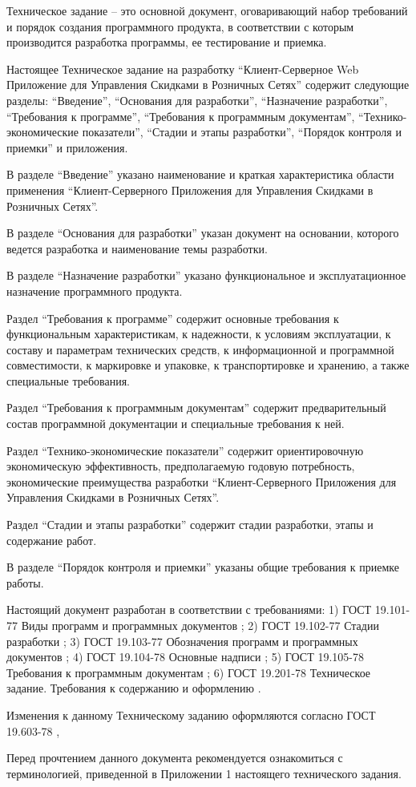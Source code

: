 
\tab[0.75cm] Техническое задание – это основной документ, оговаривающий набор требований и
порядок создания программного продукта, в соответствии с которым производится разработка
программы, ее тестирование и приемка.

Настоящее Техническое задание на разработку ``Клиент-Серверное Web Приложение для Управления Скидками в Розничных Сетях'' содержит следующие разделы: ``Введение'', ``Основания для разработки'',
``Назначение разработки'', ``Требования к программе'', ``Требования к программным документам'',
``Технико-экономические показатели'', ``Стадии и этапы разработки'', ``Порядок контроля и
приемки'' и приложения.

В разделе ``Введение'' указано наименование и краткая характеристика области применения
``Клиент-Серверного Приложения для Управления Скидками в Розничных Сетях''.

В разделе ``Основания для разработки'' указан документ на основании, которого ведется
разработка и наименование темы разработки.

В разделе ``Назначение разработки'' указано функциональное и эксплуатационное
назначение программного продукта.

Раздел ``Требования к программе'' содержит основные требования к функциональным
характеристикам, к надежности, к условиям эксплуатации, к составу и параметрам технических
средств, к информационной и программной совместимости, к маркировке и упаковке, к
транспортировке и хранению, а также специальные требования.

Раздел ``Требования к программным документам'' содержит предварительный состав
программной документации и специальные требования к ней.

Раздел ``Технико-экономические показатели'' содержит ориентировочную экономическую
эффективность, предполагаемую годовую потребность, экономические преимущества разработки
``Клиент-Серверного Приложения для Управления Скидками в Розничных Сетях''.

Раздел ``Стадии и этапы разработки'' содержит стадии разработки, этапы и содержание
работ.

В разделе ``Порядок контроля и приемки'' указаны общие требования к приемке работы.

Настоящий документ разработан в соответствии с требованиями:
1) ГОСТ 19.101-77 Виды программ и программных документов \cite{gost_types_of_software};
2) ГОСТ 19.102-77 Стадии разработки \cite{gost_stages_of_devel};
3) ГОСТ 19.103-77 Обозначения программ и программных документов \cite{gost_marking_software};
4) ГОСТ 19.104-78 Основные надписи \cite{gost_main_signs};
5) ГОСТ 19.105-78 Требования к программным документам \cite{gost_demands_for_docs};
6) ГОСТ 19.201-78 Техническое задание. Требования к содержанию и оформлению \cite{gost_tz}.


Изменения к данному Техническому заданию оформляются согласно ГОСТ 19.603-78 \cite{gost_main_rules_change},

Перед прочтением данного документа рекомендуется ознакомиться с терминологией,
приведенной в Приложении 1 настоящего технического задания.
